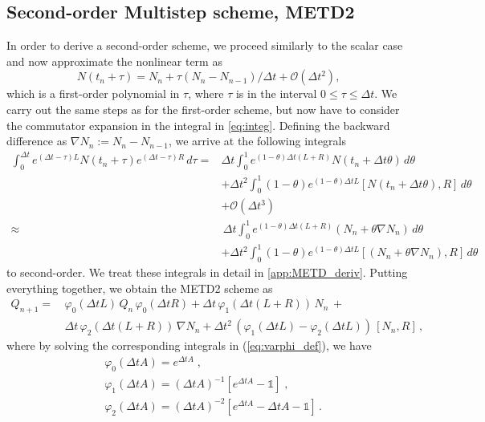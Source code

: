 \documentclass[12pt]{article}
\begin{document}
\subsection{Second-order Multistep scheme, METD2}
\label{sec:metd2}
In order to derive a second-order scheme, we proceed similarly to the scalar case \cite{cox-matthews:2002} and now approximate the nonlinear term as 
\begin{equation*}
    N(t_n + \tau) = N_{n} +\tau (N_{n}- N_{n-1})/\Delta t+ \mathcal O(\Delta t^{2}),
\end{equation*}
 which is a first-order polynomial in $\tau$, where $\tau$ is in the interval $0\leq \tau \leq \Delta t$. We carry out the same steps as for the first-order scheme, but now have to consider the commutator expansion in the integral in \eqref{eq:integ}. Defining the backward difference as $\nabla N_n := N_n - N_{n-1}$, we arrive at the following integrals 
\begin{align}
    \label{eq:ETD2_integ}
    \int_0^{\Delta t} e^{(\Delta t-\tau)L} N(t_n+\tau) e^{(\Delta t-\tau)R}\,d\tau =& \nonumber  \nonumber
    \Delta t\int_0^{1} e^{(1-\theta)\Delta t(L+R)} N(t_n+\Delta t \theta)\,d\theta \nonumber \\
    & +\Delta t^2 \int_0^{1} (1-\theta) e^{(1-\theta)\Delta t L} [N(t_n+\Delta t \theta),R]\,d\theta \nonumber \\ &+ \mathcal O(\Delta t^3) \\ 
    \approx & \, \Delta t \int_0^{1} e^{(1-\theta)\Delta t(L+R)} (N_n + \theta \nabla N_n)\,d\theta \,  \nonumber  \\
    & + \Delta t^2 \int_0^{1} (1-\theta) e^{(1-\theta)\Delta t L} [(N_n + \theta \nabla N_n),R]\,d\theta  \nonumber
\end{align}
to second-order. We treat these integrals in detail in \ref{app:METD_deriv}. Putting everything together, we obtain the METD2 scheme as
\begin{align}
\label{eq:etd2-eqn}
  Q_{n+1} = \,&\varphi_0(\Delta tL)\, Q_{n} \, \varphi_0(\Delta tR) + \Delta t \, \varphi_1(\Delta t(L+R))\, N_n \, + \nonumber \\&\Delta t \,\varphi_2(\Delta t(L+R))\, \nabla N_n + \Delta t^2 \,(\varphi_1(\Delta t L)- \varphi_2(\Delta t L))\, [N_n,R]\,, 
\end{align}
where by solving the corresponding integrals in (\ref{eq:varphi_def}), we have
\begin{align*}
    &\varphi_0(\Delta tA) = e^{\Delta t A}\; \text{,} \\ &\varphi_1(\Delta tA)  = (\Delta t A)^{-1}\left[e^{\Delta t A} - \mathds{1}\right]\; \text{,} \\ &\varphi_2(\Delta tA)  = (\Delta t A)^{-2}\left[e^{\Delta t A} - \Delta t A - \mathds{1}\right]\, .
\end{align*}
\end{document}

